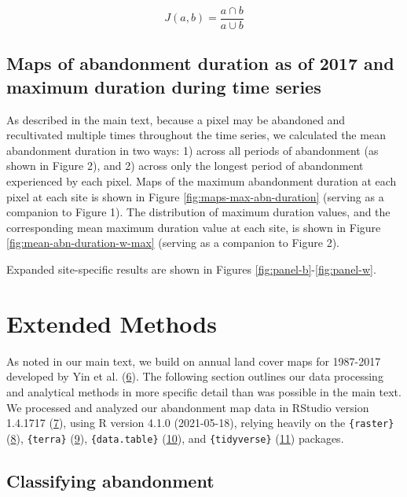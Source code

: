 \documentclass[9pt,lineno]{pnas-new}
\begin{document}
\begin{equation}
J(a,b) = \frac{a\cap b}{a\cup b} \label{eq:jaccard-equation}
\end{equation}

\hypertarget{maps-of-abandonment-duration-as-of-2017-and-maximum-duration-during-time-series}{%
\subsection{Maps of abandonment duration as of 2017 and maximum duration during time series}\label{maps-of-abandonment-duration-as-of-2017-and-maximum-duration-during-time-series}}

As described in the main text, because a pixel may be abandoned and recultivated multiple times throughout the time series, we calculated the mean abandonment duration in two ways: 1) across all periods of abandonment (as shown in Figure 2), and 2) across only the longest period of abandonment experienced by each pixel.
Maps of the maximum abandonment duration at each pixel at each site is shown in Figure \ref{fig:maps-max-abn-duration} (serving as a companion to Figure 1).
The distribution of maximum duration values, and the corresponding mean maximum duration value at each site, is shown in Figure \ref{fig:mean-abn-duration-w-max} (serving as a companion to Figure 2).

Expanded site-specific results are shown in Figures \ref{fig:panel-b}-\ref{fig:panel-w}.

\hypertarget{methods-si}{%
\section{Extended Methods}\label{methods-si}}

As noted in our main text, we build on annual land cover maps for 1987-2017 developed by Yin et al. (\protect\hyperlink{ref-Yin2020}{6}).
The following section outlines our data processing and analytical methods in more specific detail than was possible in the main text.
We processed and analyzed our abandonment map data in RStudio version 1.4.1717 (\protect\hyperlink{ref-RStudio}{7}), using R version 4.1.0 (2021-05-18), relying heavily on the \texttt{\{raster\}} (\protect\hyperlink{ref-R-raster}{8}), \texttt{\{terra\}} (\protect\hyperlink{ref-R-terra}{9}), \texttt{\{data.table\}} (\protect\hyperlink{ref-R-data.table}{10}), and \texttt{\{tidyverse\}} (\protect\hyperlink{ref-R-tidyverse}{11}) packages.

\hypertarget{classifying-abandonment}{%
\subsection{Classifying abandonment}\label{classifying-abandonment}}
\end{document}
